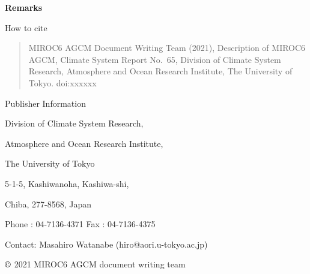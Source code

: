 \textbf{Remarks}

\hfill\break
\hfill\break
\hfill\break

How to cite

\begin{quote}
MIROC6 AGCM Document Writing Team (2021), Description of MIROC6 AGCM, Climate System Report No.~65, Division of Climate System Research, Atmosphere and Ocean Research Institute, The University of
Tokyo. doi:xxxxxx
\end{quote}

\hfill\break
\hfill\break
\hfill\break

Publisher Information

Division of Climate System Research,

Atmosphere and Ocean Research Institute,

The University of Tokyo

5-1-5, Kashiwanoha, Kashiwa-shi,

Chiba, 277-8568, Japan

Phone : 04-7136-4371 Fax : 04-7136-4375

Contact: Masahiro Watanabe (hiro@aori.u-tokyo.ac.jp)

\hfill\break
\hfill\break
\hfill\break
\hfill\break

\(\copyright\) 2021 MIROC6 AGCM document writing team
